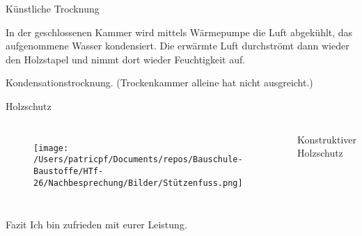 \begin{frame}{Künstliche Trocknung}
\begin{Fragenblock}
    In der geschlossenen Kammer wird mittels Wärmepumpe die Luft abgekühlt, das aufgenommene Wasser kondensiert. Die erwärmte Luft durchströmt dann wieder den Holzstapel und nimmt dort wieder Feuchtigkeit auf.
\end{Fragenblock}
\pause
\begin{myLösung}
Kondensationstrocknung. (Trockenkammer alleine hat nicht ausgreicht.)
\end{myLösung}

\end{frame}

\begin{frame}{Holzschutz}
\begin{columns}
\begin{figure}
    \texttt{[image: /Users/patricpf/Documents/repos/Bauschule-Baustoffe/HTf-26/Nachbesprechung/Bilder/Stützenfuss.png]}
\end{figure}

\begin{myLösung}
Konstruktiver Holzschutz
\end{myLösung}
\end{columns}
\end{frame}

\begin{frame}{Fazit}
    Ich bin zufrieden mit eurer Leistung.

\end{frame}


